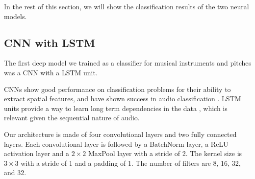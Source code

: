 \documentclass[runningheads,a4paper]{llncs}
\begin{document}

In the rest of this section, we will show the classification results of the two neural models. 

\subsection{CNN with LSTM}

The first deep model we trained as a classifier for musical instruments and pitches was a CNN with a LSTM unit. 

CNNs show good performance on classification problems for their ability to extract spatial features, and have shown success in audio classification \cite{Hershey17}. LSTM units provide a way to learn long term dependencies in the data \cite{Hochreiter97}, which is relevant given the sequential nature of audio.

Our architecture is made of four convolutional layers and two fully connected layers. Each convolutional layer is followed by a BatchNorm layer, a ReLU activation layer and a $2 \times 2$  MaxPool layer with a stride of 2. The kernel size is $3 \times 3$ with a stride of 1 and a padding of 1. The number of filters are 8, 16, 32, and 32.
\end{document}
